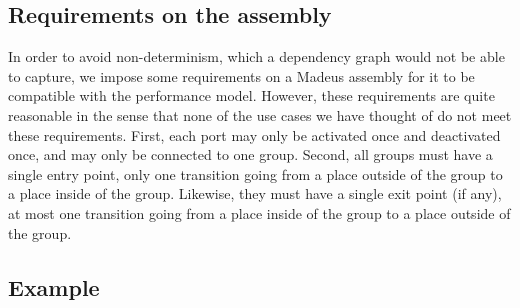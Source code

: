 \subsection{Requirements on the assembly}

In order to avoid non-determinism, which a dependency graph would not be
able to capture, we impose some requirements on a Madeus assembly
for it to be compatible with the performance model. However, these
requirements are quite reasonable in the sense that none of the use
cases we have thought of do not meet these requirements.
%
First, each port may only be activated once and deactivated once, and
may only be connected to one group. Second, all groups must have a
single entry point, \ie only one transition going from a place outside
of the group to a place inside of the group. Likewise, they must have a
single exit point (if any), \ie at most one transition going from a
place inside of the group to a place outside of the group.

\subsection{Example}


